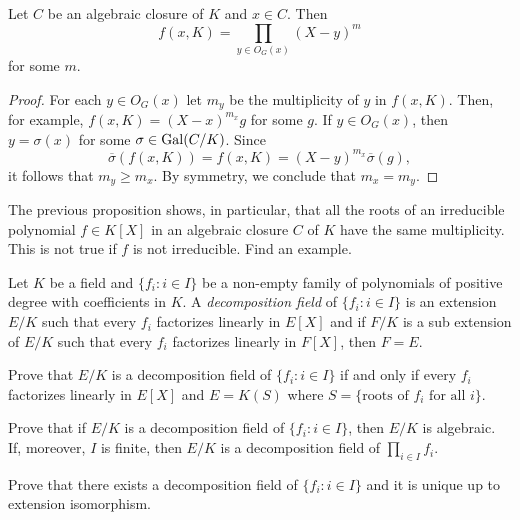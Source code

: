 \begin{proposition}
    Let $C$ be an algebraic closure of $K$ and $x\in C$. Then 
    \[
    f(x,K)=\prod_{y\in O_G(x)}(X-y)^m
    \]
    for some $m$. 
\end{proposition}

\begin{proof}
    For each $y\in O_G(x)$ let $m_y$ be the multiplicity
    of $y$ in $f(x,K)$. 
    Then, for example,
    $f(x,K)=(X-x)^{m_x}g$ for some $g$. If $y\in O_G(x)$, 
    then $y=\sigma(x)$ for some $\sigma\in\operatorname{Gal}(C/K)$. Since
    \[
    \overline{\sigma}(f(x,K))=f(x,K)=(X-y)^{m_x}\overline{\sigma}(g), 
    \]
    it follows that $m_y\geq m_x$. By symmetry, 
    we conclude that $m_x=m_y$. 
\end{proof}

The previous proposition shows, in particular, 
that all the roots of 
an irreducible polynomial $f\in K[X]$ 
in an algebraic closure $C$ of $K$
have the same multiplicity. This is  
not true if $f$ is not irreducible. Find an example.



\begin{definition}
    Let $K$ be a field and $\{f_i:i\in I\}$ be a non-empty 
    family of polynomials of positive degree
    with coefficients in $K$. A \emph{decomposition field} 
    of $\{f_i:i\in I\}$ is an extension $E/K$
    such that every $f_i$ factorizes linearly in $E[X]$ and 
    if $F/K$ is a sub extension of $E/K$ such that every $f_i$ 
    factorizes linearly in $F[X]$, then $F=E$. 
\end{definition}

\begin{exercise}
    Prove that $E/K$ is a decomposition field of
    $\{f_i:i\in I\}$ if and only if every $f_i$ factorizes linearly 
    in $E[X]$ and $E=K(S)$ where $S=\{\text{roots of $f_i$ for all $i$}\}$. 
\end{exercise}

\begin{exercise}
    Prove that if $E/K$ is a decomposition field
    of $\{f_i:i\in I\}$, then $E/K$ is algebraic. If, moreover, 
    $I$ is finite, then $E/K$ is a decomposition field
    of $\prod_{i\in I}f_i$. 
\end{exercise}

\begin{exercise}
    Prove that 
    there exists a decomposition field of $\{f_i:i\in I\}$ 
    and it is unique up to extension isomorphism. 
\end{exercise}

